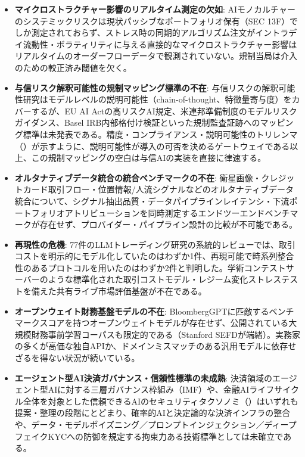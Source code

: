 \begin{itemize}
  \item \textbf{マイクロストラクチャー影響のリアルタイム測定の欠如}: AIモノカルチャーのシステミックリスクは現状パッシブなポートフォリオ保有（SEC 13F）でしか測定されておらず、ストレス時の同期的アルゴリズム注文がイントラデイ流動性・ボラティリティに与える直接的なマイクロストラクチャー影響はリアルタイムのオーダーフローデータで観測されていない。規制当局は介入のための較正済み閾値を欠く。
  \item \textbf{与信リスク解釈可能性の規制マッピング標準の不在}: 与信リスクの解釈可能性研究はモデルレベルの説明可能性（chain-of-thought、特徴量寄与度）をカバーするが、EU AI Actの高リスクAI規定、米連邦準備制度のモデルリスクガイダンス、Basel IRB内部格付け検証といった規制監査証跡へのマッピング標準は未発表である。精度・コンプライアンス・説明可能性のトリレンマ（\cite{fintrilemma2026}）が示すように、説明可能性が導入の可否を決めるゲートウェイである以上、この規制マッピングの空白は与信AIの実装を直接に律速する。
  \item \textbf{オルタナティブデータ統合の統合ベンチマークの不在}: 衛星画像・クレジットカード取引フロー・位置情報/人流シグナルなどのオルタナティブデータ統合について、シグナル抽出品質・データパイプラインレイテンシ・下流ポートフォリオアトリビューションを同時測定するエンドツーエンドベンチマークが存在せず、プロバイダー・パイプライン設計の比較が不可能である。
  \item \textbf{再現性の危機}: 77件のLLMトレーディング研究の系統的レビュー\cite{agentictrading2026}では、取引コストを明示的にモデル化していたのはわずか1件、再現可能で時系列整合性のあるプロトコルを用いたのはわずか2件と判明した。学術コンテストサーバーのような標準化された取引コストモデル・レジーム変化ストレステストを備えた共有ライブ市場評価基盤が不在である。
  \item \textbf{オープンウェイト財務基盤モデルの不在}: BloombergGPT\cite{bloomberggpt2023}に匹敵するベンチマークスコアを持つオープンウェイトモデルが存在せず、公開されている大規模財務事前学習コーパスも限定的である（Stanford SEFD\cite{stanfordedgar2026}が端緒）。実務家の多くが高価な独自APIか、ドメインミスマッチのある汎用モデルに依存せざるを得ない状況が続いている。
  \item \textbf{エージェント型AI決済ガバナンス・信頼性標準の未成熟}: 決済領域のエージェント型AIに対する三層ガバナンス枠組み（IMF\cite{imfpayments2026}）や、金融AIライフサイクル全体を対象とした信頼できるAIのセキュリティタクソノミ（\cite{trustworthyfintech2026}）はいずれも提案・整理の段階にとどまり、確率的AIと決定論的な決済インフラの整合や、データ・モデルポイズニング／プロンプトインジェクション／ディープフェイクKYCへの防御を規定する拘束力ある技術標準としては未確立である。

\end{itemize}
